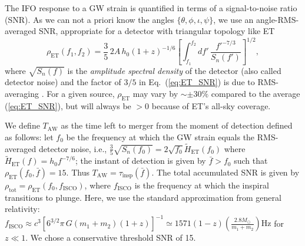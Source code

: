 \documentclass{aa}
\newcommand{\be}{\begin{equation}}
\newcommand{\ee}{\end{equation}}
\newcommand{\f}{\frac}
\begin{document}
The IFO response to a GW strain is quantified in terms of a signal-to-noise ratio (SNR).
As we can not a priori know the angles $\{\theta,\phi,\iota,\psi\}$, we use an angle-RMS-averaged SNR, 
appropriate for a detector with triangular topology like ET
%
\be
\rho_{\text{ET}}(f_1,f_2) = \frac{3}{5}\,2 A\, h_0  (1+z)^{-1/6} \left[\int_{f_1}^{f_2} d f'\, \f{f'^{-7/3}}{S_{n}(f')}\right]^{1/2} \label{eq:ET_SNR},
\ee
%
where %
$\sqrt{S_n(f)}$ is the {\it amplitude spectral density} of the detector (also called detector noise) and
the factor of $3/5$ in Eq.~(\ref{eq:ET_SNR})
is due to RMS-averaging \citep{Akcay18}. %
For a given source, $\rho_\text{ET}$ may vary by $\sim \pm 30\%$ compared to the average (\ref{eq:ET_SNR}), but will always be $>0$ because of ET's all-sky coverage.

We define $T_\text{AW}$ as the time left to merger from the moment of detection 
defined as follows: let $f_0$ be the frequency
at which the GW strain equals the RMS-averaged detector noise, i.e., $\tfrac{3}{5}\sqrt{S_n(f_0)}=2\sqrt{f_0} \tilde{H}_\text{ET}(f_0)$ where $\tilde{H}_\text{ET}(f)= h_0 f^{-7/6}$;
the instant of detection is given by 
$\bar{f}>f_0$ such that $\rho_\text{ET}(f_0,\bar{f})=15$. 
Thus $T_\text{AW} = \tau_\text{insp}(\bar{f})$.
The total accumulated SNR is given by $\rho_\text{tot}=\rho_\text{ET}(f_0, f_\text{ISCO})$, 
where $f_\text{ISCO}$ is the frequency at which the inspiral transitions to plunge. 
Here, we use the standard approximation from general relativity: 
$f_\text{ISCO} \approx {c^3}\left[{6^{3/2}\pi\, G (m_1+m_2)(1+z)}\right]^{-1} \simeq {1571}(1-z) \left(\frac{2.8M_\odot}{m_1+m_2}\right)\text{Hz}$ for $z\ll 1$. 
We chose a conservative threshold SNR of 15. %
\end{document}
